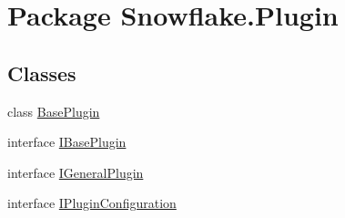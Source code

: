 \hypertarget{namespace_snowflake_1_1_plugin}{}\section{Package Snowflake.\+Plugin}
\label{namespace_snowflake_1_1_plugin}
\subsection*{Classes}
\begin{DoxyCompactItemize}
\item 
class \hyperlink{class_snowflake_1_1_plugin_1_1_base_plugin}{Base\+Plugin}
\item 
interface \hyperlink{interface_snowflake_1_1_plugin_1_1_i_base_plugin}{I\+Base\+Plugin}
\item 
interface \hyperlink{interface_snowflake_1_1_plugin_1_1_i_general_plugin}{I\+General\+Plugin}
\item 
interface \hyperlink{interface_snowflake_1_1_plugin_1_1_i_plugin_configuration}{I\+Plugin\+Configuration}
\end{DoxyCompactItemize}
